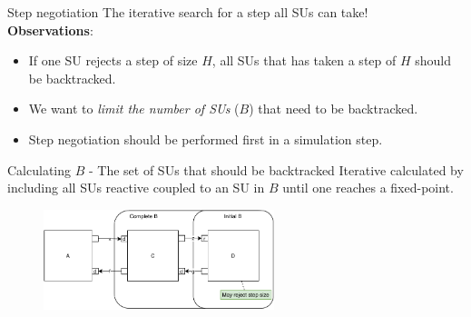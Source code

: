 \documentclass{beamer}
\begin{document}
\begin{frame}{Step negotiation}
    The iterative search for a step all SUs can take!\\
    \textbf{Observations}: 
    \begin{itemize}
            \item If one SU rejects a step of size $H$, all SUs that has taken a step of $H$ should be backtracked.
            \item We want to \emph{limit the number of SUs} ($B$) that need to be backtracked.
            \item Step negotiation should be performed first in a simulation step.
    \end{itemize}
    \begin{block}{Calculating $B$ - The set of SUs that should be backtracked}
        Iterative calculated by including all SUs reactive coupled to an SU in $B$ until one reaches a fixed-point.
    \end{block}
    \begin{figure}    
        \includegraphics[width=0.6\textwidth]{images/calcB.pdf}
    \end{figure} 
\end{frame}
\end{document}
